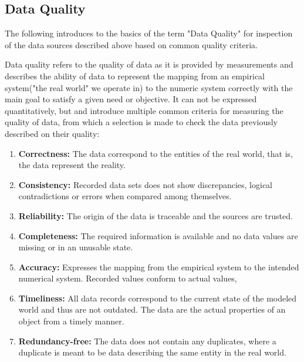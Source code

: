 \subsection{Data Quality}

The following introduces to the basics of the term "Data Quality" for inspection of the data sources
described above based on common quality criteria.

Data quality refers to the quality of data as it is provided by measurements and describes the
ability of data to represent the mapping from an empirical system("the real world" we operate in)
to the numeric system correctly with the main goal to satisfy a given need or objective.
It can not be expressed quantitatively, but \cite{Daqua13} and  \cite{Ebert07} introduce multiple
common criteria for measuring the quality of data, from which a selection is made to check the data
previously described on their quality:

\begin{enumerate}
    \item \textbf{Correctness:}
    The data correspond to the entities of the real world, that is, the data represent the reality.

    \item \textbf{Consistency:}
    Recorded data sets does not show discrepancies, logical contradictions or errors when compared
    among themselves.

    \item \textbf{Reliability:}
    The origin of the data is traceable and the sources are trusted.

    \item \textbf{Completeness:}
    The required information is available and no data values are missing or in an unusable state.

    \item \textbf{Accuracy:}
    Expresses the mapping from the empirical system to the intended numerical system. Recorded values
    conform to actual values,

    \item \textbf{Timeliness:}
    All data records correspond to the current state of the modeled world and thus are not outdated.
    The data are the actual properties of an object from a timely manner.

    \item \textbf{Redundancy-free:}
    The data does not contain any duplicates, where a duplicate is meant to be data describing the same entity
    in the real world.
\end{enumerate}


